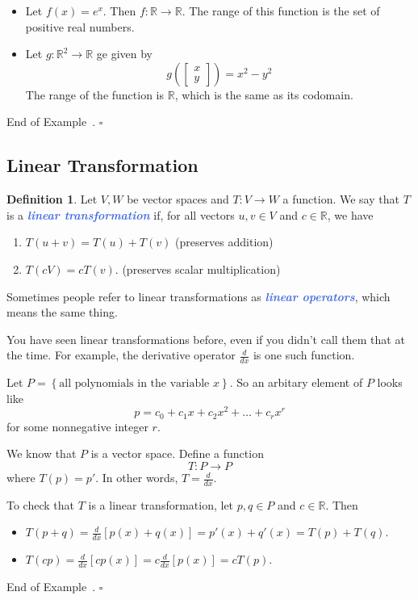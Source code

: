 \documentclass[10pt]{article}
\newcommand{\demph}[1]{\textcolor{RoyalBlue}{\textbf{\slshape #1}}} %
\theoremstyle{definition}
\newtheorem{definition}[theorem]{Definition}
\newtheorem{example}[theorem]{Example}
\renewenvironment{example}
{\begin{oldexample}}
  {\par\smallskip\hfill   End of Example~\theexample. $\square$    \par\end{oldexample}}
\newcommand{\R}{\mathbb{R}}           %
\begin{document}
\begin{example}
  \begin{itemize}
    \item Let $f(x) = e^{x}$. Then $f: \R \to \R$. The range of this function is the
    set of positive real numbers.
    \item Let $g: \R^{2} \to \R$ ge given by
    \begin{equation*}
      g \left(
        \begin{bmatrix}
          x\\y
        \end{bmatrix}
      \right)  = x^{2}-y^{2}
    \end{equation*}
    The range of the function is $\R$, which is the same as its codomain.
  \end{itemize}
\end{example}

\subsection{Linear Transformation}
\begin{definition}
  Let $V,W$ be vector spaces and $T:V \to W$ a function. We say that $T$ is a
  \demph{linear transformation} if, for all vectors $u,v\in V$ and $c\in \R$,
  we have
  \begin{enumerate}[label=(\roman*)]
    \item $T(u+v)= T(u)+T(v) $ \quad (preserves addition)
    \item $T(cV)= cT(v)$.  \quad (preserves scalar multiplication)
  \end{enumerate}
  Sometimes people refer to linear transformations as \demph{linear
    operators}, which means the same thing.
\end{definition}

You have seen linear transformations before, even if you didn't call them that
at the time. For example, the derivative operator $\frac{d}{dx}$ is one such
function.

\begin{example}
  Let $P= \left\{ \text{all polynomials in the variable }x\right\}$. So an
  arbitary element of $P$ looks like
  \begin{equation*}
    p = c_{0}+c_{1}x+c_{2}x^{2}+\ldots+c_{r}x^{r}
  \end{equation*}
  for some nonnegative integer $r$.
  
  We know that $P$ is a vector space. Define a function
  \begin{equation*}
    T: P \to P
  \end{equation*}
  where $T(p) = p'$. In other words, $T= \frac{d}{dx}$.

  To check that $T$ is a linear transformation, let $p,q\in P$ and $c\in \R$. Then
  \begin{itemize}
    \item $T(p+q) = \frac{d}{dx}\left[ p(x)+q(x) \right]= p'(x)+q'(x) =
    T(p)+ T(q)$. 
    \item $T(cp)= \frac{d}{dx}\left[ cp(x) \right]= c \frac{d}{dx} \left[ p(x)
    \right] = c T(p)$.
  \end{itemize}
\end{example}
\end{document}
